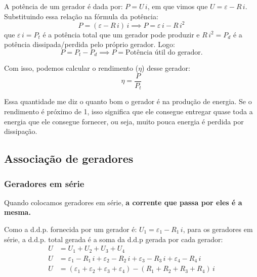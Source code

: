 \documentclass[12pt]{extarticle}
\newcommand{\<}{\langle}
\renewcommand{\>}{\rangle}
\theoremstyle{definition}
\begin{document}
A potência de um gerador é dada por: $P = U\,i$, em que vimos que $U = \varepsilon - R\,i$. Substituindo essa relação na fórmula da potência:
\begin{equation}
    P = (\varepsilon - R\,i)\,i \implies P = \varepsilon\,i - R\,i^2
\end{equation}
\noindent que $\varepsilon\,i = P_t$ é a potência total que um gerador pode produzir e $R\,i^2 = P_d$ é a potência dissipada/perdida pelo próprio gerador. Logo:
\begin{equation}
    P = P_t - P_d \implies P = \text{Potência útil do gerador.}
\end{equation}

Com isso, podemos calcular o rendimento ($\eta$) desse gerador:
\begin{equation}
    \eta = \frac{P}{P_t}
\end{equation}

Essa quantidade me diz o quanto bom o gerador é na produção de energia. Se o rendimento é próximo de 1, isso significa que ele consegue entregar quase toda a energia que ele consegue fornecer, ou seja, muito pouca energia é perdida por dissipação.

\subsection{Associação de geradores}
\subsubsection{Geradores em série}
Quando colocamos geradores em série, \textbf{a corrente que passa por eles é a mesma.}

Como a d.d.p. fornecida por um gerador é: $U_1 = \varepsilon_1 - R_1\,i$, para os geradores em série, a d.d.p. total gerada é a soma da d.d.p gerada por cada gerador:
\begin{equation}
    \begin{split}
        U &= U_1 + U_2 + U_3 + U_4\\
        U &= \varepsilon_1 - R_1\,i + \varepsilon_2 - R_2\,i + \varepsilon_3 - R_3\,i + \varepsilon_4 - R_4\,i\\
        U &= (\varepsilon_1 + \varepsilon_2 + \varepsilon_3 + \varepsilon_4) - (R_1 + R_2 + R_3 + R_4)\,i
    \end{split}
\end{equation}
\end{document}
